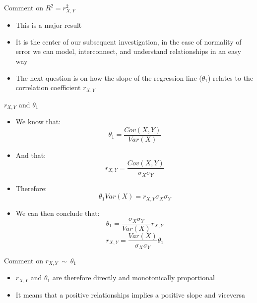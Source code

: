 \documentclass{beamer}
\begin{document}
\begin{frame}
{\centerline{Comment on $R^2 = r_{X,Y}^2$ }}
\begin{itemize}
\item This is a major result\\
\item It is the center of our subsequent investigation, in the case of normality of error we can model, interconnect, and understand relationships in an easy way\\
\item The next question is on how the slope of the regression line ($\theta_1$) relates to the correlation coefficient $r_{X,Y}$

\end{itemize}

\end{frame}

\begin{frame}
{\centerline{$ r_{X,Y} $ and $\theta_1$}}
\begin{itemize}
\item We know that:
$$ \theta_1  = \frac { Cov(X,Y)} { Var(X) } $$
\item And that:
$$r_{X,Y} = \frac{Cov(X,Y)}{\sigma_X\sigma_Y}$$
\item Therefore:
$$ \theta_1  Var(X) = r_{X,Y}  \sigma_X\sigma_Y $$
\item We can then conclude that:
$$ \theta_1  = \frac{\sigma_X\sigma_Y}{Var(X)} r_{X,Y}   $$
$$ r_{X,Y}   = \frac{Var(X)}{\sigma_X\sigma_Y} \theta_1  $$

\end{itemize}

\end{frame}


\begin{frame}
{\centerline{Comment on $ r_{X,Y} ~ \sim ~ \theta_1$}}
\begin{itemize}
\item $ r_{X,Y} $ and $\theta_1$ are therefore directly and monotonically proportional
\item It means that a positive relationships implies a positive slope and viceversa
\end{itemize}

\end{frame}
\end{document}
